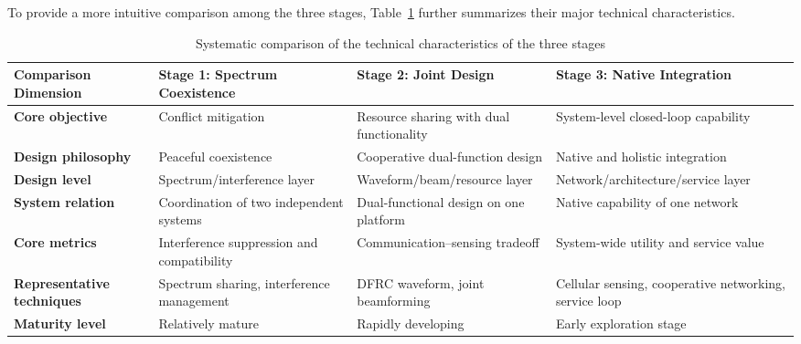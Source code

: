 To provide a more intuitive comparison among the three stages, Table~\ref{tab:stage-comparison} further summarizes their major technical characteristics.

\renewcommand{\arraystretch}{1.2}
\setlength{\tabcolsep}{4pt}

\begin{longtable}{|>{\centering\arraybackslash}p{3.0cm}|
                  >{\RaggedRight\arraybackslash}p{3.8cm}|
                  >{\RaggedRight\arraybackslash}p{3.8cm}|
                  >{\RaggedRight\arraybackslash}p{3.8cm}|}
\caption{Systematic comparison of the technical characteristics of the three stages}
\label{tab:stage-comparison} \\
\hline
\textbf{Comparison Dimension} & 
\textbf{Stage 1: Spectrum Coexistence} & 
\textbf{Stage 2: Joint Design} & 
\textbf{Stage 3: Native Integration} \\
\hline
\endfirsthead

%

\endlastfoot

\textbf{Core objective} & 
Conflict mitigation & 
Resource sharing with dual functionality & 
System-level closed-loop capability \\
\hline

\textbf{Design philosophy} & 
Peaceful coexistence & 
Cooperative dual-function design & 
Native and holistic integration \\
\hline

\textbf{Design level} & 
Spectrum/interference layer & 
Waveform/beam/\allowbreak resource layer & 
Network/architecture/\allowbreak service layer \\
\hline

\textbf{System relation} & 
Coordination of two independent systems & 
Dual-functional design on one platform & 
Native capability of one network \\
\hline

\textbf{Core metrics} & 
Interference suppression and compatibility & 
Communication--sensing tradeoff & 
System-wide utility and service value \\
\hline

\textbf{Representative techniques} & 
Spectrum sharing, interference management & 
DFRC waveform, joint beamforming & 
Cellular sensing, cooperative networking, service loop \\
\hline

\textbf{Maturity level} & 
Relatively mature & 
Rapidly developing & 
Early exploration stage \\
\hline

\end{longtable}

